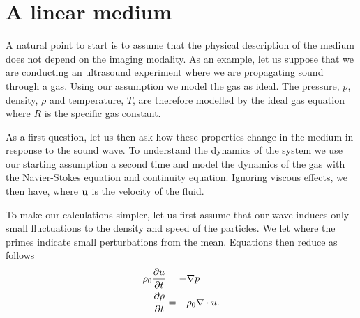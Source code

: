 \section{A linear medium}
A natural point to start is to assume that the physical description of the medium does not depend on the imaging modality.
As an example, let us suppose that we are conducting an ultrasound experiment where we are propagating sound through a gas.
Using our assumption we model the gas as ideal. 
The pressure, $p$, density, $\rho$ and temperature, $T$, are therefore modelled by the ideal gas equation
where $R$ is the specific gas constant.

As a first question, let us then ask how these properties change in the medium in response to the sound wave.
To understand the dynamics of the system we use our starting assumption a second time and model the dynamics of the gas with the  Navier-Stokes equation and continuity equation.
Ignoring viscous effects, we then have,
where $\textbf{u}$ is the velocity of the fluid.



To make our calculations simpler, let us first assume that our wave induces only small fluctuations to the density and speed of the particles.
We let 
where the primes indicate  small perturbations from the mean.
Equations  then reduce as follows
\begin{align}
 \rho_0  \frac{\partial u}{\partial t} &= - \nabla p \label{eqn:euclidianNSLinear} \\
 \frac{\partial \rho }{\partial t} &=  - \rho_0  \nabla \cdot u. \label{eqn:euclidianContinuityLinear}
\end{align}

